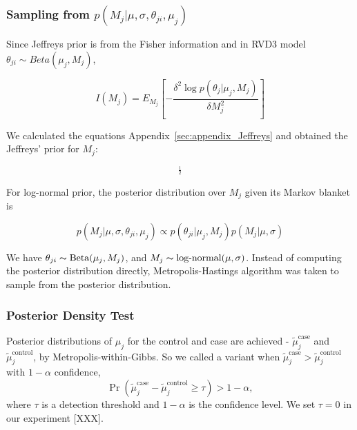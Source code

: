 \documentclass[11pt,reqno]{amsart}
\begin{document}
\subsubsection{Sampling from $p \left( M_{j} |\mu,\sigma, \theta_{ji},\mu_j\right)$}
Since Jeffreys prior is from the Fisher information and in RVD3 model ${\theta }_{ji}\sim Beta\left( {\mu }_{j},{M}_{j}\right)$,

\begin{equation}\label{equ:JefferyInference}
I\left({M}_{j}\right)={E}_{{M}_{j}}\left[ -\frac{\delta ^{2}\log p\left(\theta _{j}|\mu_{j},M_{j}\right)}{\delta M^{2}_{j}}\right]
\end{equation}

We calculated the equations Appendix~\ref{sec:appendix_Jeffreys} and obtained the Jeffreys' prior for $M_j$:

\begin{equation}
[-\left(\Psi_{1}(M_{j}) - \Psi_{1}(\mu_{j} M_{j})\mu_{j}^{2} - \Psi_{1}((1-\mu_{j})M_{j}){(1-\mu_{j})^{2}}\right)]^{\frac{1}{2}}
\end{equation}

For log-normal prior, the posterior distribution over $M_{j}$ given its Markov blanket is

\begin{equation}
	p( M_{j} |\mu, \sigma, \theta_{ji},\mu_j) \propto p(\theta_{ji} | \mu_j, M_j) p(M_{j} | \mu, \sigma)
\end{equation}

We have $ \theta_{ji}\thicksim\text{Beta}(\mu_{j},M_{j})$, and $ M_{j} \thicksim \text{log-normal}(\mu, \sigma)$.
Instead of computing the posterior distribution directly, Metropolis-Hastings algorithm was taken to sample from the posterior distribution.

\subsubsection{Posterior Density Test}\label{sec:hypothesis_test}
Posterior distributions of $\mu_j$ for the control and case are achieved -  $\tilde{\mu}_j^{\text{case}}$ and $\tilde{\mu}_j^{\text{control}}$, by Metropolis-within-Gibbs.
So we called a variant when $\tilde{\mu}_j^{\text{case}} > \tilde{\mu}_j^{\text{control}}$ with $1-\alpha$ confidence,
\begin{equation}\label{eqn:bayes_test}
	\Pr( \tilde{\mu}_j^{\text{case}} - \tilde{\mu}_j^{\text{control}} \geq \tau ) > 1-\alpha,
\end{equation}
where $\tau$ is a detection threshold and $1-\alpha$ is the confidence level. We set $\tau = 0$ in our experiment [XXX].
\end{document}
